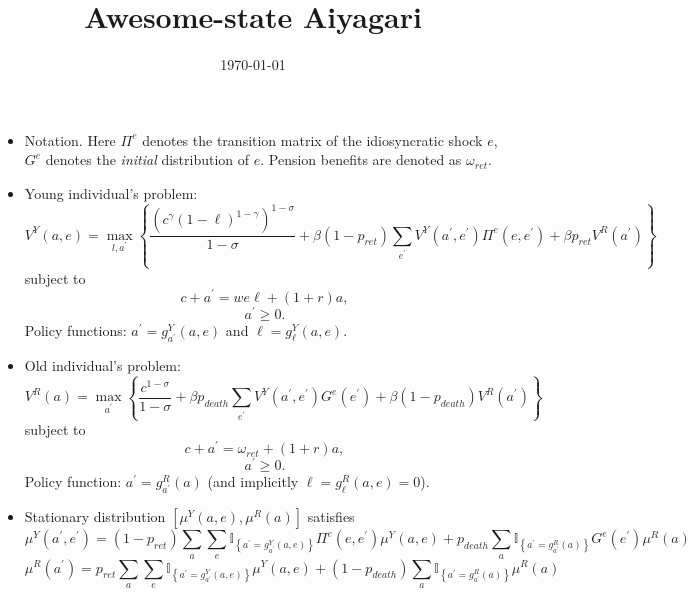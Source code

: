 \documentclass[12pt]{article}
\begin{document}
\title{\textbf{Awesome-state Aiyagari}}
\date{\today }
\author{}
\maketitle

\begin{itemize}
\item Notation. Here $\Pi ^{e}$ denotes the transition matrix of the
idiosyncratic shock $e$, $G^{e}$ denotes the \textit{initial} distribution
of $e$. Pension benefits are denoted as $\omega _{ret}$.

\item Young individual's problem:%
\begin{equation*}
V^{Y}(a,e)=\max_{l,a^{\prime }}\left\{ \frac{\left( c^{\gamma }\left( 1-\ell
\right) ^{1-\gamma }\right) ^{1-\sigma }}{1-\sigma }+\beta \left(
1-p_{ret}\right) \sum_{e^{\prime }}V^{Y}(a^{\prime },e^{\prime })\Pi
^{e}(e,e^{\prime })+\beta p_{ret}V^{R}(a^{\prime })\right\} 
\end{equation*}%
subject to%
\begin{equation*}
c+a^{\prime }=we\ell +(1+r)a,
\end{equation*}%
\begin{equation*}
a^{\prime }\geq 0.
\end{equation*}%
Policy functions: $a^{\prime }=g_{a^{\prime }}^{Y}(a,e)$ and $\ell =g_{\ell
}^{Y}(a,e)$.

\item Old individual's problem:%
\begin{equation*}
V^{R}(a)=\max_{a^{\prime }}\left\{ \frac{c^{1-\sigma }}{1-\sigma }+\beta
p_{death}\sum_{e^{\prime }}V^{Y}(a^{\prime },e^{\prime })G^{e}(e^{\prime
})+\beta \left( 1-p_{death}\right) V^{R}(a^{\prime })\right\} 
\end{equation*}%
subject to%
\begin{equation*}
c+a^{\prime }=\omega _{ret}+(1+r)a,
\end{equation*}%
\begin{equation*}
a^{\prime }\geq 0.
\end{equation*}%
Policy function: $a^{\prime }=g_{a^{\prime }}^{R}(a)$ (and implicitly $\ell
=g_{\ell }^{R}(a,e)=0$).

\item Stationary distribution $\left[ \mu ^{Y}(a,e),\mu ^{R}(a)\right] $
satisfies%
\begin{equation*}
\mu ^{Y}(a^{\prime },e^{\prime })=\left( 1-p_{ret}\right) \sum_{a}\sum_{e}%
\mathbb{I}_{\left\{ a^{\prime }=g_{a^{\prime }}^{Y}\left( a,e\right)
\right\} }\Pi ^{e}(e,e^{\prime })\mu ^{Y}(a,e)+p_{death}\sum_{a}\mathbb{I}%
_{\left\{ a^{\prime }=g_{a^{\prime }}^{R}\left( a\right) \right\}
}G^{e}(e^{\prime })\mu ^{R}(a)
\end{equation*}%
\begin{equation*}
\mu ^{R}(a^{\prime })=p_{ret}\sum_{a}\sum_{e}\mathbb{I}_{\left\{ a^{\prime
}=g_{a^{\prime }}^{Y}\left( a,e\right) \right\} }\mu
^{Y}(a,e)+(1-p_{death})\sum_{a}\mathbb{I}_{\left\{ a^{\prime }=g_{a^{\prime
}}^{R}\left( a\right) \right\} }\mu ^{R}(a)
\end{equation*}


\end{itemize}
\end{document}
